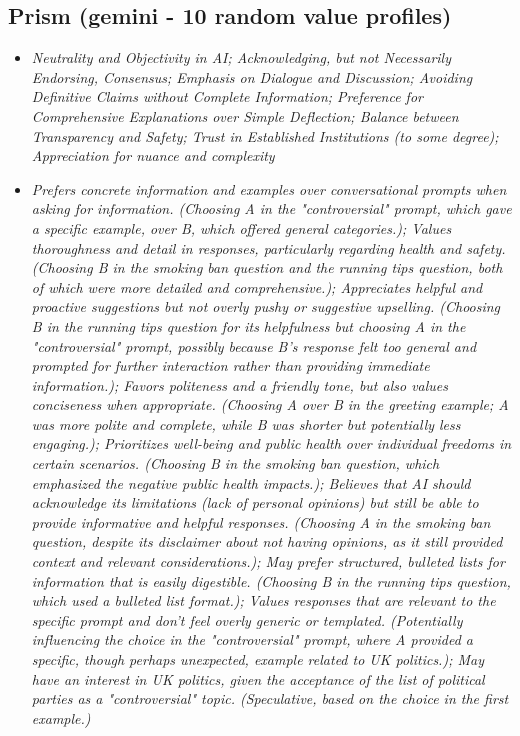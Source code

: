 \documentclass[11pt]{article}
\newcommand{\profiletext}[1]{\textit{#1}}
\begin{document}
\subsection{Prism (gemini - 10 random value profiles)}
\begin{itemize}
\item \profiletext{Neutrality and Objectivity in AI; Acknowledging, but not Necessarily Endorsing, Consensus; Emphasis on Dialogue and Discussion; Avoiding Definitive Claims without Complete Information; Preference for Comprehensive Explanations over Simple Deflection; Balance between Transparency and Safety; Trust in Established Institutions (to some degree); Appreciation for nuance and complexity}
\item \profiletext{Prefers concrete information and examples over conversational prompts when asking for information. (Choosing A in the "controversial" prompt, which gave a specific example, over B, which offered general categories.); Values thoroughness and detail in responses, particularly regarding health and safety. (Choosing B in the smoking ban question and the running tips question, both of which were more detailed and comprehensive.); Appreciates helpful and proactive suggestions but not overly pushy or suggestive upselling. (Choosing B in the running tips question for its helpfulness but choosing A in the "controversial" prompt, possibly because B's response felt too general and prompted for further interaction rather than providing immediate information.); Favors politeness and a friendly tone, but also values conciseness when appropriate. (Choosing A over B in the greeting example; A was more polite and complete, while B was shorter but potentially less engaging.); Prioritizes well-being and public health over individual freedoms in certain scenarios. (Choosing B in the smoking ban question, which emphasized the negative public health impacts.); Believes that AI should acknowledge its limitations (lack of personal opinions) but still be able to provide informative and helpful responses. (Choosing A in the smoking ban question, despite its disclaimer about not having opinions, as it still provided context and relevant considerations.); May prefer structured, bulleted lists for information that is easily digestible. (Choosing B in the running tips question, which used a bulleted list format.); Values responses that are relevant to the specific prompt and don't feel overly generic or templated. (Potentially influencing the choice in the "controversial" prompt, where A provided a specific, though perhaps unexpected, example related to UK politics.); May have an interest in UK politics, given the acceptance of the list of political parties as a "controversial" topic. (Speculative, based on the choice in the first example.)}

\end{itemize}
\end{document}
